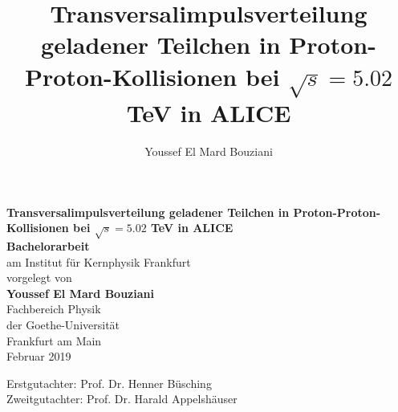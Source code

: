\documentclass[12pt,a4paper]{report}
\author{Youssef El Mard Bouziani}
\title{Transversalimpulsverteilung geladener Teilchen in Proton-Proton-Kollisionen bei  $\sqrt{s} = 5.02$ TeV in ALICE}
\begin{document}
\begin{titlepage}
\begin{center}

\vspace*{4cm}  

\huge{\textbf{Transversalimpulsverteilung geladener Teilchen in Proton-Proton-Kollisionen bei  $\sqrt{s} = 5.02$ TeV in ALICE}}\\[2cm]
\vfill
\Large{\textbf{Bachelorarbeit}}\\
am Institut für Kernphysik Frankfurt\\
\vfill
vorgelegt von\\[1cm]
\Large{\textbf{Youssef El Mard Bouziani}}\\[1cm]
\vfill
Fachbereich Physik\\
der Goethe-Universität\\
Frankfurt am Main\\
\vspace*{1cm}
Februar 2019
\end{center}
\end{titlepage}


\vspace*{22cm}
\large{Erstgutachter: Prof. Dr. Henner Büsching}\\
\large{Zweitgutachter: Prof. Dr. Harald Appelshäuser}
\normalsize
{}
\newpage
\tableofcontents
\newpage

\setcounter{chapter}{-1}
\end{document}

